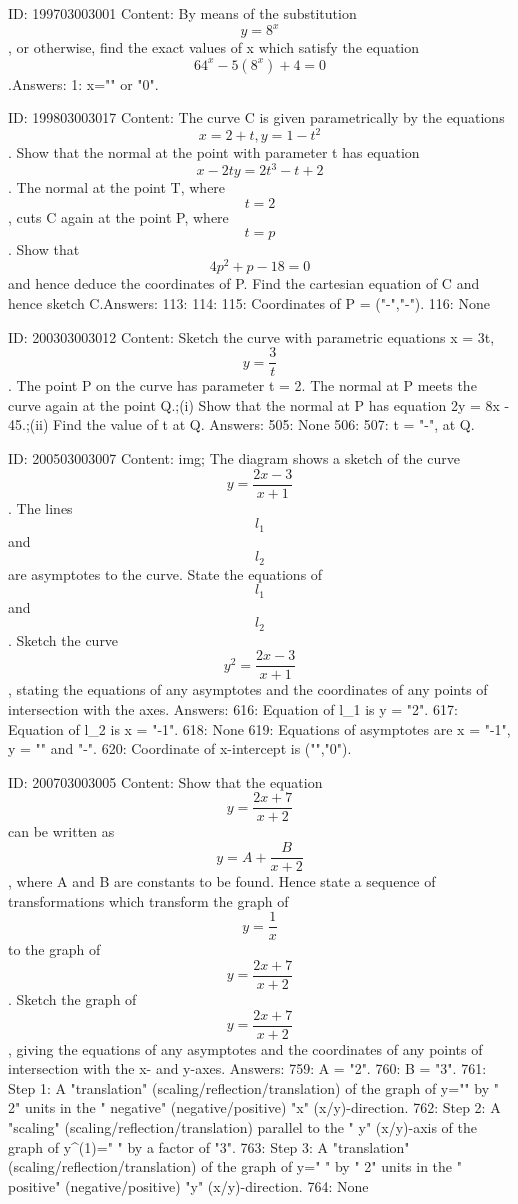 \documentclass{article}
\begin{document}
ID: 199703003001
Content:
By means of the substitution \[y = 8^{x}\], or otherwise, find the exact values of x which satisfy the equation \[64^{x} - 5(8^{x}) + 4 = 0\].Answers:
1: x="" or "0".

ID: 199803003017
Content:
The curve C is given parametrically by the equations $$x = 2 + t, y = 1 - t^2$$. Show that the normal at the point with parameter t has equation $$x - 2ty = 2 t^3 - t + 2$$. The normal at the point T, where $$t = 2$$, cuts C again at the point P, where $$t = p$$. Show that $$4 p^2 + p - 18 = 0$$ and hence deduce the coordinates of P. Find the cartesian equation of C and hence sketch C.Answers:
113: 
114: 
115: Coordinates of P = ("-","-").
116: None

ID: 200303003012
Content:
Sketch the curve with parametric equations x = 3t,  $$y = \frac{3}{t}$$. The point P on the curve has parameter t = 2. The normal at P meets the curve again at the point Q.;(i) Show that the normal at P has equation 2y = 8x - 45.;(ii) Find the value of t at Q. Answers:
505: None
506: 
507: t = "-", at Q.

ID: 200503003007
Content:
img; The diagram shows a sketch of the curve $$y = \frac{2x - 3}{x + 1}$$. The lines $$l_1$$ and $$l_2$$ are asymptotes to the curve. State the equations of $$l_1$$ and $$l_2$$. Sketch the curve $$y^2 = \frac{2x - 3}{x + 1}$$, stating the equations of any asymptotes and the coordinates of any points of intersection with the axes. Answers:
616: Equation of l_1 is y = "2".
617: Equation of l_2 is x = "-1".
618: None
619: Equations of asymptotes are x = "-1", y = "" and "-".
620: Coordinate of x-intercept is ("","0").

ID: 200703003005
Content:
Show that the equation $$y=\frac{2x+7}{x+2} $$ can be written as $$y= A + \frac{B}{x+2} $$, where A and B are constants to be found. Hence state a sequence of transformations which transform the graph of $$y= \frac{1}{x} $$ to the graph of $$y= \frac{2x + 7}{x + 2}$$.  Sketch the graph of $$y= \frac{2x + 7}{x + 2} $$, giving the equations of any asymptotes and the coordinates of any points of intersection with the x- and y-axes.  Answers:
759: A = "2".
760: B = "3".
761: Step 1: A "translation" (scaling/reflection/translation) of the graph of y="" by " 2" units in the " negative" (negative/positive) "x" (x/y)-direction.
762: Step 2: A "scaling" (scaling/reflection/translation) parallel to the " y" (x/y)-axis of the graph of y^{(1)}=" " by a factor of "3".
763: Step 3: A "translation" (scaling/reflection/translation) of the graph of y=" " by " 2" units in the " positive" (negative/positive) "y" (x/y)-direction.
764: None
\end{document}
